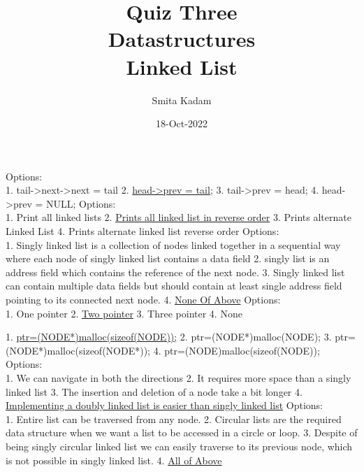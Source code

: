 \documentclass{report}
\title{\Huge{Quiz Three\\Datastructures}\\Linked List}
\author{\huge{Smita Kadam}}
\date{18-Oct-2022}
\begin{document}
\maketitle
{}
\setlength{\parindent}{0pt}
Options:\\
1. tail->next->next = tail
2. \underline{head->prev = tail;}
3. tail->prev = head;
4. head->prev = NULL;
\setlength{\parindent}{0pt}
Options:\\
1. Print all linked lists
2. \underline{Prints all linked list in reverse order}
3. Prints alternate Linked List
4. Prints alternate linked list reverse order
\setlength{\parindent}{0pt}
Options:\\
1. Singly linked list is a collection of nodes linked together in a sequential way where each node of singly linked list contains a data field
2. singly list is an address field which contains the reference of the next node.
3. Singly linked list can contain multiple data fields but should contain at least single address field pointing to its connected next node.
4. \underline{None Of Above}
\setlength{\parindent}{0pt}
Options:\\
1. One pointer
2. \underline{Two pointer}
3. Three pointer
4. None

\setlength{\parindent}{0pt}
1. \underline{ptr=(NODE*)malloc(sizeof(NODE));}
2. ptr=(NODE*)malloc(NODE);
3. ptr=(NODE*)malloc(sizeof(NODE*));
4. ptr=(NODE)malloc(sizeof(NODE));
\setlength{\parindent}{0pt}
Options:\\
1. We can navigate in both the directions
2. It requires more space than a singly linked list
3. The insertion and deletion of a node take a bit longer
4. \underline{Implementing a doubly linked list is easier than singly linked list}
\pagebreak
{}
\setlength{\parindent}{0pt}
Options:\\
1. Entire list can be traversed from any node.
2. Circular lists are the required data structure when we want a list to be accessed in a circle or loop.
3. Despite of being singly circular linked list we can easily traverse to its previous node, which is not possible in singly linked list.
4. \underline{All of Above}
\end{document}

